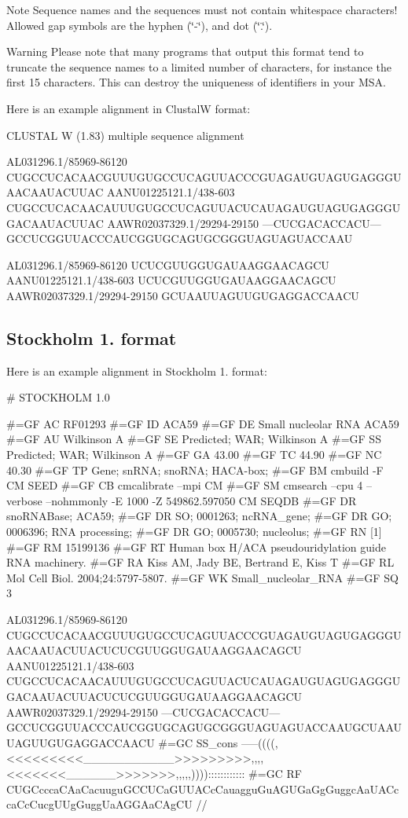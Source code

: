 \begin{DoxyNote}{Note}
Sequence names and the sequences must not contain whitespace characters! Allowed gap symbols are the hyphen {\itshape }(\char`\"{}-\/\char`\"{}), and dot {\itshape }(\char`\"{}.\char`\"{}).
\end{DoxyNote}
\begin{DoxyWarning}{Warning}
Please note that many programs that output this format tend to truncate the sequence names to a limited number of characters, for instance the first 15 characters. This can destroy the uniqueness of identifiers in your M\+SA.
\end{DoxyWarning}
Here is an example alignment in ClustalW format\+: \begin{DoxyVerb}CLUSTAL W (1.83) multiple sequence alignment


AL031296.1/85969-86120      CUGCCUCACAACGUUUGUGCCUCAGUUACCCGUAGAUGUAGUGAGGGUAACAAUACUUAC
AANU01225121.1/438-603      CUGCCUCACAACAUUUGUGCCUCAGUUACUCAUAGAUGUAGUGAGGGUGACAAUACUUAC
AAWR02037329.1/29294-29150  ---CUCGACACCACU---GCCUCGGUUACCCAUCGGUGCAGUGCGGGUAGUAGUACCAAU

AL031296.1/85969-86120      UCUCGUUGGUGAUAAGGAACAGCU
AANU01225121.1/438-603      UCUCGUUGGUGAUAAGGAACAGCU
AAWR02037329.1/29294-29150  GCUAAUUAGUUGUGAGGACCAACU \end{DoxyVerb}
\hypertarget{file_formats_msa-formats-stockholm}{}\subsection{Stockholm 1. format}\label{file_formats_msa-formats-stockholm}
Here is an example alignment in Stockholm 1. format\+: \begin{DoxyVerb}# STOCKHOLM 1.0

#=GF AC   RF01293
#=GF ID   ACA59
#=GF DE   Small nucleolar RNA ACA59
#=GF AU   Wilkinson A
#=GF SE   Predicted; WAR; Wilkinson A
#=GF SS   Predicted; WAR; Wilkinson A
#=GF GA   43.00
#=GF TC   44.90
#=GF NC   40.30
#=GF TP   Gene; snRNA; snoRNA; HACA-box;
#=GF BM   cmbuild -F CM SEED
#=GF CB   cmcalibrate --mpi CM
#=GF SM   cmsearch --cpu 4 --verbose --nohmmonly -E 1000 -Z 549862.597050 CM SEQDB
#=GF DR   snoRNABase; ACA59;
#=GF DR   SO; 0001263; ncRNA_gene;
#=GF DR   GO; 0006396; RNA processing;
#=GF DR   GO; 0005730; nucleolus;
#=GF RN   [1]
#=GF RM   15199136
#=GF RT   Human box H/ACA pseudouridylation guide RNA machinery.
#=GF RA   Kiss AM, Jady BE, Bertrand E, Kiss T
#=GF RL   Mol Cell Biol. 2004;24:5797-5807.
#=GF WK   Small_nucleolar_RNA
#=GF SQ   3


AL031296.1/85969-86120     CUGCCUCACAACGUUUGUGCCUCAGUUACCCGUAGAUGUAGUGAGGGUAACAAUACUUACUCUCGUUGGUGAUAAGGAACAGCU
AANU01225121.1/438-603     CUGCCUCACAACAUUUGUGCCUCAGUUACUCAUAGAUGUAGUGAGGGUGACAAUACUUACUCUCGUUGGUGAUAAGGAACAGCU
AAWR02037329.1/29294-29150 ---CUCGACACCACU---GCCUCGGUUACCCAUCGGUGCAGUGCGGGUAGUAGUACCAAUGCUAAUUAGUUGUGAGGACCAACU
#=GC SS_cons               -----((((,<<<<<<<<<___________>>>>>>>>>,,,,<<<<<<<______>>>>>>>,,,,,))))::::::::::::
#=GC RF                    CUGCcccaCAaCacuuguGCCUCaGUUACcCauagguGuAGUGaGgGuggcAaUACccaCcCucgUUgGuggUaAGGAaCAgCU
//\end{DoxyVerb}

